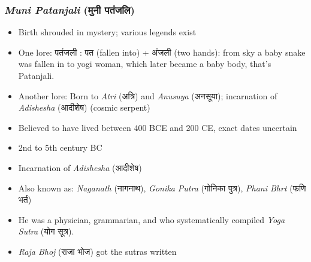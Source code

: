 \begin{frame}[fragile]\frametitle{\textit{Muni Patanjali} (मुनी पतंजलि)}

    \begin{itemize}
        \item Birth shrouded in mystery; various legends exist
		\item One lore: पतंजली : पत (fallen into) + अंजली (two hands): from sky a baby snake was fallen in to yogi woman, which later became a baby body, that's Patanjali.
        \item Another lore: Born to \textit{Atri} (अत्रि) and \textit{Anusuya} (अनसूया); incarnation of \textit{Adishesha} (आदीशेष) (cosmic serpent)
        \item Believed to have lived between 400 BCE and 200 CE, exact dates uncertain
        \item 2nd to 5th century BC
        \item Incarnation of \textit{Adishesha} (आदीशेष)
        \item Also known as: \textit{Naganath} (नागनाथ), \textit{Gonika Putra} (गोनिका पुत्र), \textit{Phani Bhrt} (फणि भर्त)
        \item He was a physician, grammarian, and who systematically compiled \textit{Yoga Sutra} (योग सूत्र).
        \item \textit{Raja Bhoj} (राजा भोज) got the sutras written
    \end{itemize}

\end{frame}


